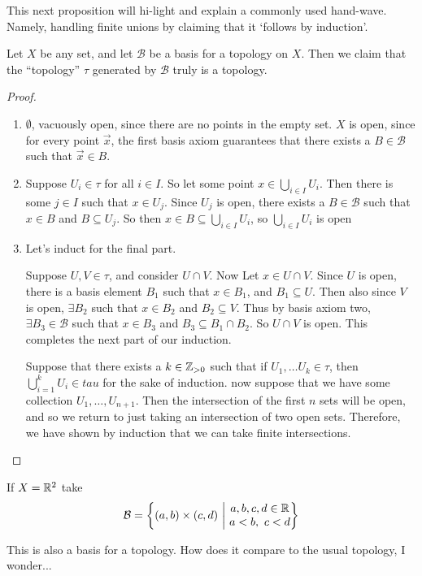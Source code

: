 \documentclass[12pt, twosided]{article}
\begin{document}
This next proposition will hi-light and explain a commonly used hand-wave. Namely, handling finite unions by claiming that it `follows by induction'.
\begin{prop}
  Let \(X\) be any set, and let \(\mathcal{B}\) be a basis for a topology on \(X\). Then we claim that the ``topology'' \(\tau\) generated by \(\mathcal{B}\) truly is a topology.
\end{prop}
\begin{proof}
  \begin{enumerate}
  \item \(\emptyset\), vacuously open, since there are no points in the empty set.
    \(X\) is open, since for every point \(\vec{x}\), the first basis axiom guarantees that there exists a \(B \in \mathcal{B}\) such that \(\vec{x} \in B\).
  \item Suppose \(U_i \in \tau\) for all \(i \in I\). So let some point \(x \in \bigcup_{i \in I} U_i\). Then there is some \(j \in I\) such that \(x \in U_j\). Since \(U_j\) is open, there exists a \(B \in \mathcal{B}\) such that \(x \in B\) and \(B \subseteq U_j\). So then \(x \in B \subseteq \bigcup_{i \in I}U_i\), so \(\bigcup_{i \in I} U_i\) is open
  \item Let's induct for the final part.

    Suppose \(U, V \in \tau\), and consider \(U \cap V\). Now Let \(x \in U \cap V\). Since \(U\) is open, there is a basis element \(B_1\) such that \(x \in B_1\), and \(B_1 \subseteq U\). Then also since \(V\) is open, \(\exists B_2\) such that \(x \in B_2\) and \(B_2 \subseteq V\). Thus by basis axiom two, \(\exists B_3 \in \mathcal{B}\) such that \(x \in B_3\) and \(B_3 \subseteq B_1 \cap B_2\). So \(U \cap V\) is open. This completes the next part of our induction.

    Suppose that there exists a \(k \in \mathbb{Z}_{>0}\) such that if \(U_1, \ldots U_k \in \tau\), then \(\bigcup_{i = 1}^k U_i \in tau\) for the sake of induction. now suppose that we have some collection \(U_1, \ldots, U_{n+1}\). Then the intersection of the first \(n\) sets will be open, and so we return to just taking an intersection of two open sets. Therefore, we have shown by induction that we can take finite intersections.
  \end{enumerate}
\end{proof}

\begin{exa}
  If \(X = \mathbb{R}^2\) take \[\mathcal{B} = \left\{ (a, b) \times (c, d) \ \middle\vert\  \begin{matrix} a, b, c, d \in \mathbb{R} \\ a < b, \ c < d \end{matrix} \right\}\]

  This is also a basis for a topology. How does it compare to the usual topology, I wonder...
\end{exa}
\end{document}
